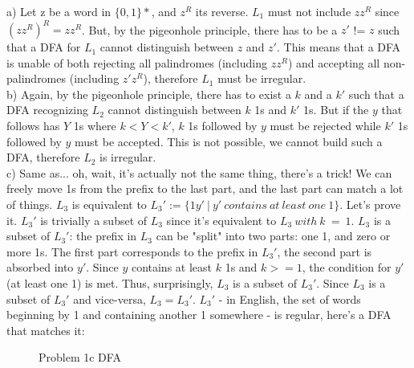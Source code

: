 
a) Let z be a word in $\{0, 1\}*$, and $z^R$ its reverse. $L_1$ must not include $zz^R$ since $(zz^R)^R = zz^R$. 
But, by the pigeonhole principle, there has to be a $z'$ != $z$ such that a DFA for $L_1$ cannot distinguish between $z$ and $z'$. 
This means that a DFA is unable of both rejecting all palindromes (including $zz^R$) and accepting all non-palindromes (including $z'z^R$), therefore $L_1$ must be irregular. \\

b) Again, by the pigeonhole principle, there has to exist a $k$ and a $k'$ such that a DFA recognizing $L_2$ cannot distinguish between $k$ 1s and $k'$ 1s. 
But if the $y$ that follows has $Y$ 1s where $k < Y < k'$, $k$ 1s followed by $y$ must be rejected while $k'$ 1s followed by $y$ must be accepted.
This is not possible, we cannot build such a DFA, therefore $L_2$ is irregular. \\

c) Same as... oh, wait, it's actually not the same thing, there's a trick!
We can freely move 1s from the prefix to the last part, and the last part can match a lot of things. $L_3$ is equivalent to $L_3' := \{ 1y'\ |\ y'\ contains\ at\ least\ one\ 1 \}$. Let's prove it.
$L_3'$ is trivially a subset of $L_3$ since it's equivalent to $L_3\ with\ k\ =\ 1$.
$L_3$ is a subset of $L_3'$: the prefix in $L_3$ can be "split" into two parts: one 1, and zero or more 1s. The first part corresponds to the prefix in $L_3'$, the second part is absorbed into $y'$.
Since $y$ contains at least $k$ 1s and $k >= 1$, the condition for $y'$ (at least one 1) is met. Thus, surprisingly, $L_3$ is a subset of $L_3'$.
Since $L_3$ is a subset of $L_3'$ and vice-versa, $L_3 = L_3'$.
$L_3'$ - in English, the set of words beginning by 1 and containing another 1 somewhere - is regular, here's a DFA that matches it:

\begin{figure}[H]
\centering
{}
\caption{Problem 1c DFA}
\end{figure}
